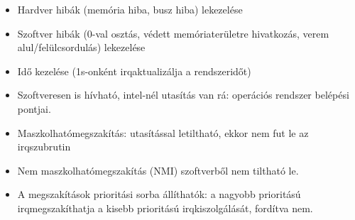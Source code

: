 \documentclass[11pt,a4paper]{article}
\begin{document}
\begin{tcolorbox}[colback=blue!5!white,colframe=blue!50!black,title= 15. Ismertesse a periféria csatolási módszereket{,} módszerenként kitérve az adott módszer előnyére{,} és hátrányára! Part 1.]
\begin{itemize}
\begin{itemize}
                        \item Hardver hibák (memória hiba, busz hiba) lekezelése
                        \item Szoftver hibák (0-val osztás, védett memóriaterületre hivatkozás, verem alul/felülcsordulás) lekezelése
                        \item Idő kezelése (1s-onként irqaktualizálja a rendszeridőt)
                        \item Szoftveresen is hívható, intel-nél utasítás van rá: operációs rendszer belépési pontjai.
                        \item Maszkolhatómegszakítás: utasítással letiltható, ekkor nem fut le az irqszubrutin
                        \item Nem maszkolhatómegszakítás (NMI) szoftverből nem tiltható le.
                        \item A megszakítások prioritási sorba állíthatók: a nagyobb prioritású irqmegszakíthatja a kisebb prioritású irqkiszolgálását, fordítva nem.
                    \end{itemize}
                \end{itemize}
            \end{tcolorbox}
\end{document}
